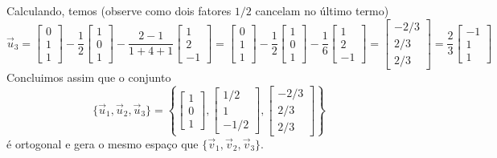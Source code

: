 \begin{ex}
\noindent Calculando, temos (observe como dois fatores $1/2$ cancelam no último termo)
\begin{equation}
\vec{u}_3 =
\begin{bmatrix}
0 \\ 1 \\ 1
\end{bmatrix}  - \frac{1}{2}
\begin{bmatrix}
1 \\ 0 \\ 1
\end{bmatrix} - \frac{2 - 1}{1 + 4 +1}
\begin{bmatrix}
1 \\ 2 \\ -1
\end{bmatrix} =
\begin{bmatrix}
0 \\ 1 \\ 1
\end{bmatrix}  - \frac{1}{2}
\begin{bmatrix}
1 \\ 0 \\ 1
\end{bmatrix} - \frac{1}{6}
\begin{bmatrix}
1 \\ 2 \\ -1
\end{bmatrix} =
\begin{bmatrix}
-2/3 \\ 2/3 \\ 2/3
\end{bmatrix} = \frac{2}{3}
\begin{bmatrix}
-1 \\ 1 \\ 1
\end{bmatrix}
\end{equation} Concluimos assim que o conjunto
\begin{equation}
\{ \vec{u}_1, \vec{u}_2, \vec{u}_3 \} = \left\{
\begin{bmatrix}
1 \\ 0 \\ 1
\end{bmatrix},
\begin{bmatrix}
1/2 \\ 1 \\ -1/2
\end{bmatrix},
\begin{bmatrix}
-2/3 \\ 2/3 \\ 2/3
\end{bmatrix}  \right\}
\end{equation} é ortogonal e gera o mesmo espaço que $\{ \vec{v}_1, \vec{v}_2, \vec{v}_3 \}$.


\end{ex}
